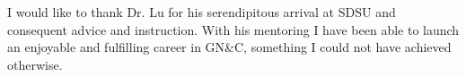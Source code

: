 \documentclass{sdsu-thesis}
\theoremstyle{dtm}
\begin{document}
\begin{glossarypage}
  \glsaddall\printglossary[title=]
\end{glossarypage}


\begin{acknowledgments}
I would like to thank Dr. Lu for his serendipitous arrival at SDSU and consequent 
advice and instruction. With his mentoring I have been able to launch an enjoyable 
and fulfilling career in GN\&C, something I could not have achieved otherwise. 

%
\end{acknowledgments}

%
%


% 
% 


% 
% 
% 


\cite{CITRON}
\cite{CHERRY}
\cite{KLUMPP}
\cite{CERIMELE}


\end{document}
